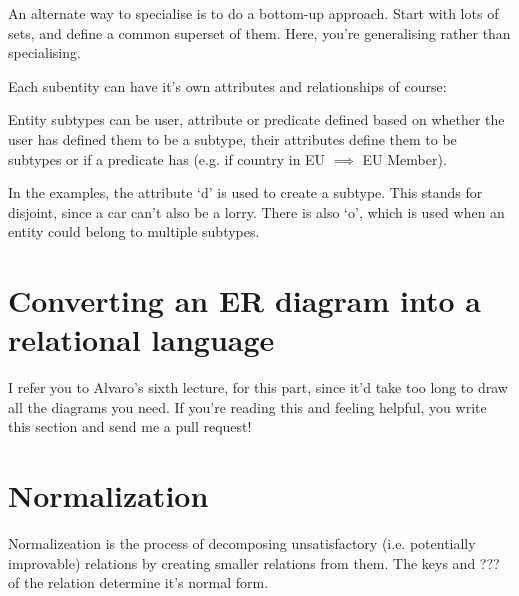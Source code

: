 An alternate way to specialise is to do a bottom-up approach. Start with lots of
sets, and define a common superset of them. Here, you're generalising rather
than specialising.

Each subentity can have it's own attributes and relationships of course:

\begin{center}
\end{center}

Entity subtypes can be user, attribute or predicate defined based on whether the
user has defined them to be a subtype, their attributes define them to be
subtypes or if a predicate has (e.g. if country in EU $\implies$ EU Member).

In the examples, the attribute `d' is used to create a subtype. This stands for
disjoint, since a car can't also be a lorry. There is also `o', which is used
when an entity could belong to multiple subtypes.

\section{Converting an ER diagram into a relational language}

I refer you to Alvaro's sixth lecture, for this part, since it'd take too long
to draw all the diagrams you need. If you're reading this and feeling helpful,
you write this section and send me a pull request!

\section{Normalization}

Normalizeation is the process of decomposing unsatisfactory (i.e. potentially
improvable) relations by creating smaller relations from them. The keys and ???
of the relation determine it's normal form.

